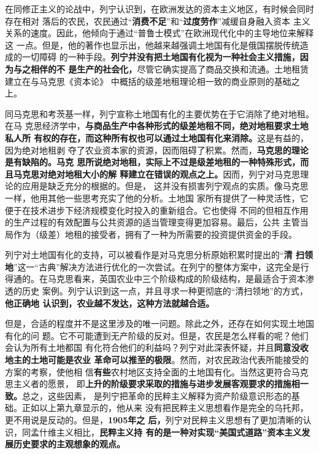 在同修正主义的论战中，列宁认识到，在欧洲发达的资本主义地区，有时候会同时存在相对
落后的农民，农民通过“\textbf{消费不足}”和“\textbf{过度劳作}”减缓自身融入资本
主义关系的速度。因此，他倾向于通过“普鲁士模式”在欧洲现代化中的主导地位来解释这
一点。但是，他的著作也显示出，他越来越强调土地国有化是俄国摆脱传统造成的一切障碍
的一种手段。\textbf{列宁并没有把土地国有化视为一种社会主义措施，因为与之相伴的不
  是生产的社会化，}尽管它确实提高了商品交换和流通。土地租赁建立在与马克思《资本论》
中概括的级差地租理论相一致的商业原则的基础之上。

同马克思和考茨基一样，列宁宣称土地国有化的主要优势在于它消除了绝对地租。在马
克思经济学中，\textbf{与商品生产中各种形式的级差地租不同，绝对地租要求土地私人所
有权的存在，而这种所有权也可以通过土地国有化来消除。}这是有益的，因为绝对地租剥
夺了农业资本家的资源，因而阻碍了积累。然而，\textbf{马克思的理论是有缺陷的。马克
思所说绝对地租，实际上不过是级差地租的一种特殊形式，而且马克思对绝对地租大小的解
释建立在错误的观点之上。}因而，列宁对马克思理论的应用是缺乏充分的根据的。但是，
这并没有损害列宁观点的实质。像马克思一样，他用其他一些思考充实了他的分析。土地国
家所有提供了一种灵活性，它便于在技术进步下经济规模变化时投入的重新组合。它也使得
不同的但相互作用的生产过程的有效配置与公共资源的适当管理变得更加容易。最后，公共
主管当局作为（级差）地租的接受者，拥有了一种为所需要的投资提供资金的手段。

列宁对土地国有化的支持，可以被看作是对马克思分析原始积累时提出的“\textbf{清
扫领地}”这一“古典”解决方法进行优化的一次尝试。在列宁的整体方案中，这完全是行
得通的。在马克思看来，英国农业中三个阶级构成的阶级结构，是最适合于资本渗透的历史
案例。列宁认识到这一点，并且寻求一种更彻底的“清扫领地”的方式，\textbf{他正确地
认识到，农业越不发达，这种方法就越合适。}

但是，合适的程度并不是这里涉及的唯一问题。除此之外，还存在如何实现土地国有化的问
题。它不可能遭到无产阶级的反对。但是，农民是怎么样看的呢？他们会认为所有土地都国
有化符合他们的利益吗？列宁对此深表怀疑，并且\textbf{同意没收地主的土地可能是农业
  革命可以推至的极限}。然而，对农民政治代表所能接受的方案的考察，使他相
信\textbf{有些}农村地区支持全面的土地国有化。当然这更符合马克思主义者的愿景，
即\textbf{上升的阶级要求采取的措施与进步发展客观要求的措施相一致。}总之，这些因素，
是列宁把革命的民粹主义解释为资产阶级意识形态的基础。正如以上第九章显示的，他从来
没有把民粹主义思想看作是完全的乌托邦，更不用说是反动的。但是，\textbf{1905年之
  后，}列宁对民粹主义思想有了更加清晰的认识，同孟什维主义相比，\textbf{民粹主义持
  有的是一种对实现“美国式道路”资本主义发展历史要求的主观想象的观点。}

